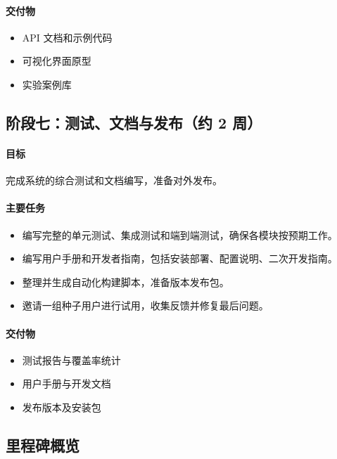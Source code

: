 \paragraph{交付物}
\begin{itemize}
  \item API 文档和示例代码
  \item 可视化界面原型
  \item 实验案例库
\end{itemize}

\subsection{阶段七：测试、文档与发布（约 2 周）}

\paragraph{目标} 完成系统的综合测试和文档编写，准备对外发布。

\paragraph{主要任务}
\begin{itemize}
  \item 编写完整的单元测试、集成测试和端到端测试，确保各模块按预期工作。
  \item 编写用户手册和开发者指南，包括安装部署、配置说明、二次开发指南。
  \item 整理并生成自动化构建脚本，准备版本发布包。
  \item 邀请一组种子用户进行试用，收集反馈并修复最后问题。
\end{itemize}

\paragraph{交付物}
\begin{itemize}
  \item 测试报告与覆盖率统计
  \item 用户手册与开发文档
  \item 发布版本及安装包
\end{itemize}

\subsection{里程碑概览}

